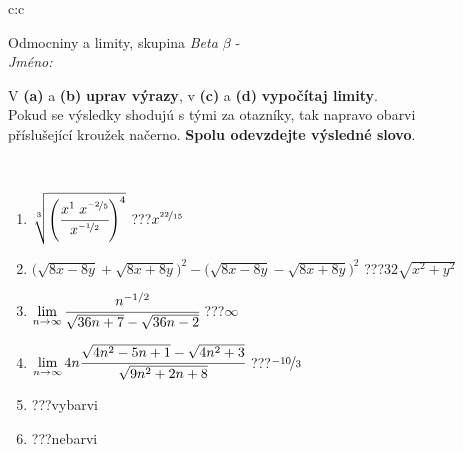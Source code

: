 \documentclass[10pt]{report}
\begin{document}
\newpage
\thispagestyle{empty}
\begin{tabular}{c:c}
\begin{minipage}[c][104.5mm][t]{0.5\linewidth}
\begin{center}
\vspace{7mm}
{\huge Odmocniny a limity, skupina \textit{Beta $\beta$} -}\\[5mm]
\textit{Jméno:}\phantom{xxxxxxxxxxxxxxxxxxxxxxxxxxxxxxxxxxxxxxxxxxxxxxxxxxxxxxxxxxxxxxxxx}\\[5mm]
\begin{minipage}{0.95\linewidth}
\begin{center}
V \textbf{(a)} a \textbf{(b)} \textbf{uprav výrazy}, v \textbf{(c)} a \textbf{(d)} \textbf{vypočítaj limity}.\\Pokud se výsledky shodujú s tými za otazníky, tak napravo obarvi\\příslušející kroužek načerno. \textbf{Spolu odevzdejte výsledné slovo}.
\end{center}
\end{minipage}
\\[1mm]
\begin{minipage}{0.79\linewidth}
\begin{center}
\begin{varwidth}{\linewidth}
\begin{enumerate}
\small
\item $\sqrt[3]{\left(\cfrac{x^{1}\;x^{\nicefrac{-2}{5}}}{x^{\nicefrac{-1}{2}}}\right)^{4}}$\quad \dotfill\; ???\;\dotfill \quad $x^{\nicefrac{22}{15}}$
\item {\footnotesize{\scriptsize$\big(\sqrt{8x-8y}+\sqrt{8x+8y}\big)^2-\big(\sqrt{8x-8y}-\sqrt{8x+8y}\big)^2$}\quad \dotfill\; ???\;\dotfill \quad $32\sqrt{x^2+y^2}$}
\item $\lim\limits_{n\to\infty}\cfrac{n^{-1/2}}{\sqrt{36n+7}-\sqrt{36n-2}}$\quad \dotfill\; ???\;\dotfill \quad $\infty$
\item $\lim\limits_{n\to\infty}4n\cfrac{\sqrt{4n^2-5n+1}-\sqrt{4n^2+3}}{\sqrt{9n^2+2n+8}}$\quad \dotfill\; ???\;\dotfill \quad $\nicefrac{-10}{3}$
\item \quad \dotfill\; ???\;\dotfill \quad vybarvi
\item \quad \dotfill\; ???\;\dotfill \quad nebarvi
\end{enumerate}
\end{varwidth}
\end{center}
\end{minipage}
\begin{minipage}{0.20\linewidth}

\end{minipage}
\end{center}
\end{minipage}
\end{tabular}
\end{document}
